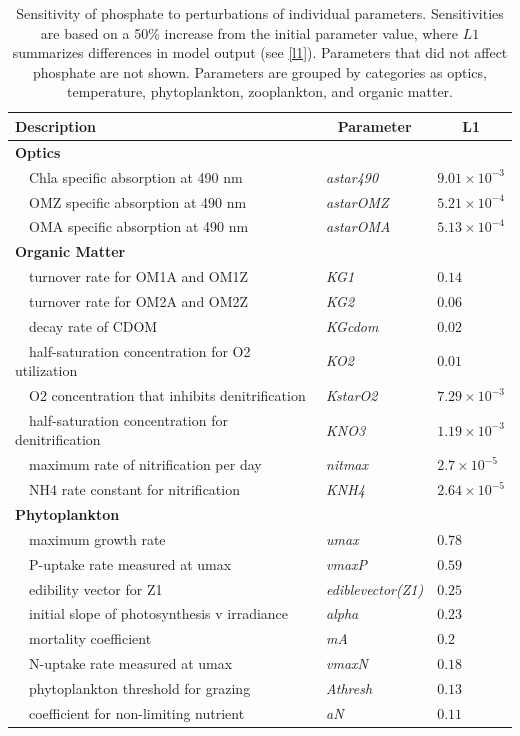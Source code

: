 \documentclass[review]{elsarticle}\usepackage[]{graphicx}\usepackage[]{color}
\begin{document}
\begin{table}[!tbp]
{\footnotesize
\caption{Sensitivity of phosphate to perturbations of individual parameters.  Sensitivities are based on a 50\% increase from the initial parameter value, where $L1$ summarizes differences in model output (see \cref{l1}).  Parameters that did not affect phosphate are not shown.  Parameters are grouped by categories as optics, temperature, phytoplankton, zooplankton, and organic matter.\label{tab:po4sens}} 
\begin{center}
\begin{tabular}{lll}
\hline\hline
\multicolumn{1}{l}{Description}&\multicolumn{1}{c}{Parameter}&\multicolumn{1}{c}{L1}\tabularnewline
\hline
{\bfseries Optics}&&\tabularnewline
~~Chla specific absorption at 490 nm&\textit{astar490}&$9.01\times 10^{-3}$\tabularnewline
~~OMZ specific absorption at 490 nm&\textit{astarOMZ}&$5.21\times 10^{-4}$\tabularnewline
~~OMA specific absorption at 490 nm&\textit{astarOMA}&$5.13\times 10^{-4}$\tabularnewline
\hline
{\bfseries Organic Matter}&&\tabularnewline
~~turnover rate for OM1A and OM1Z&\textit{KG1}&$0.14$\tabularnewline
~~turnover rate for OM2A and OM2Z&\textit{KG2}&$0.06$\tabularnewline
~~decay rate of CDOM&\textit{KGcdom}&$0.02$\tabularnewline
~~half-saturation concentration for O2 utilization&\textit{KO2}&$0.01$\tabularnewline
~~O2 concentration that inhibits denitrification&\textit{KstarO2}&$7.29\times 10^{-3}$\tabularnewline
~~half-saturation concentration for denitrification&\textit{KNO3}&$1.19\times 10^{-3}$\tabularnewline
~~maximum rate of nitrification per day&\textit{nitmax}&$2.7\times 10^{-5}$\tabularnewline
~~NH4 rate constant for nitrification&\textit{KNH4}&$2.64\times 10^{-5}$\tabularnewline
\hline
{\bfseries Phytoplankton}&&\tabularnewline
~~maximum growth rate&\textit{umax}&$0.78$\tabularnewline
~~P-uptake rate measured at umax&\textit{vmaxP}&$0.59$\tabularnewline
~~edibility vector for Z1&\textit{ediblevector(Z1)}&$0.25$\tabularnewline
~~initial slope of photosynthesis v irradiance&\textit{alpha}&$0.23$\tabularnewline
~~mortality coefficient&\textit{mA}&$0.2$\tabularnewline
~~N-uptake rate measured at umax&\textit{vmaxN}&$0.18$\tabularnewline
~~phytoplankton threshold for grazing&\textit{Athresh}&$0.13$\tabularnewline
~~coefficient for non-limiting nutrient&\textit{aN}&$0.11$\tabularnewline

\end{tabular}
\end{center}}
\end{table}
\end{document}

